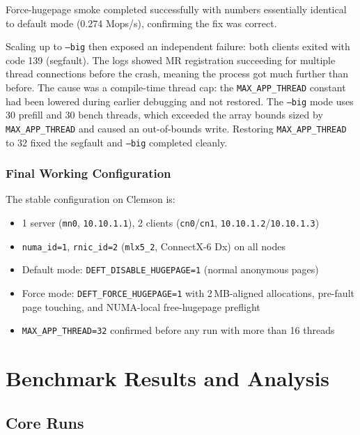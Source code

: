 \documentclass[10pt]{article}
\begin{document}
Force-hugepage smoke completed successfully with numbers essentially identical to
default mode (0.274 Mops/s), confirming the fix was correct.

Scaling up to \texttt{--big} then exposed an independent failure: both clients
exited with code 139 (segfault).
The logs showed MR registration succeeding for multiple thread connections before
the crash, meaning the process got much further than before.
The cause was a compile-time thread cap: the \texttt{MAX\_APP\_THREAD} constant
had been lowered during earlier debugging and not restored.
The \texttt{--big} mode uses 30 prefill and 30 bench threads, which exceeded the
array bounds sized by \texttt{MAX\_APP\_THREAD} and caused an out-of-bounds write.
Restoring \texttt{MAX\_APP\_THREAD} to 32 fixed the segfault and \texttt{--big}
completed cleanly.

\subsubsection{Final Working Configuration}

The stable configuration on Clemson is:
\begin{itemize}[nosep]
  \item 1 server (\texttt{mn0}, \texttt{10.10.1.1}),
    2 clients (\texttt{cn0}/\texttt{cn1}, \texttt{10.10.1.2}/\texttt{10.10.1.3})
  \item \texttt{numa\_id=1}, \texttt{rnic\_id=2} (\texttt{mlx5\_2}, ConnectX-6 Dx)
    on all nodes
  \item Default mode: \texttt{DEFT\_DISABLE\_HUGEPAGE=1} (normal anonymous pages)
  \item Force mode: \texttt{DEFT\_FORCE\_HUGEPAGE=1} with 2\,MB-aligned allocations,
    pre-fault page touching, and NUMA-local free-hugepage preflight
  \item \texttt{MAX\_APP\_THREAD=32} confirmed before any run with more than 16 threads
\end{itemize}

\section{Benchmark Results and Analysis}

\subsection{Core Runs}
\end{document}
